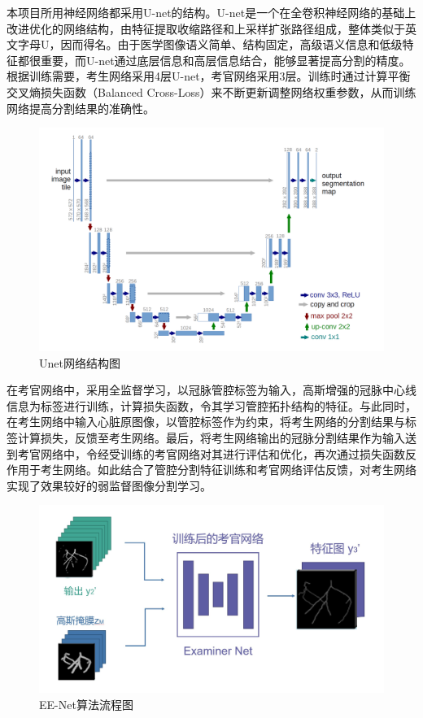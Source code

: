 \documentclass[lang=cn,11pt,a4paper,cite=numbers]{elegantpaper}
\begin{document}
本项目所用神经网络都采用U-net的结构。U-net是一个在全卷积神经网络的基础上改进优化的网络结构，由特征提取收缩路径和上采样扩张路径组成，整体类似于英文字母U，因而得名。由于医学图像语义简单、结构固定，高级语义信息和低级特征都很重要，而U-net通过底层信息和高层信息结合，能够显著提高分割的精度。根据训练需要，考生网络采用4层U-net，考官网络采用3层。训练时通过计算平衡交叉熵损失函数（Balanced Cross-Loss）来不断更新调整网络权重参数，从而训练网络提高分割结果的准确性。

\begin{figure}[H]
    \centering
    \includegraphics[scale=0.15]{./image/前期总结/Unet.png}
    \caption{Unet网络结构图}
    \label{fig:Unet}
\end{figure}


在考官网络中，采用全监督学习，以冠脉管腔标签为输入，高斯增强的冠脉中心线信息为标签进行训练，计算损失函数，令其学习管腔拓扑结构的特征。与此同时，在考生网络中输入心脏原图像，以管腔标签作为约束，将考生网络的分割结果与标签计算损失，反馈至考生网络。最后，将考生网络输出的冠脉分割结果作为输入送到考官网络中，令经受训练的考官网络对其进行评估和优化，再次通过损失函数反作用于考生网络。如此结合了管腔分割特征训练和考官网络评估反馈，对考生网络实现了效果较好的弱监督图像分割学习。

\begin{figure}[H]
    \centering
    \includegraphics[scale=0.5]{./image/前期总结/EENet.jpg}
    \caption{EE-Net算法流程图}
    \label{fig:EENet}
\end{figure}
\end{document}
